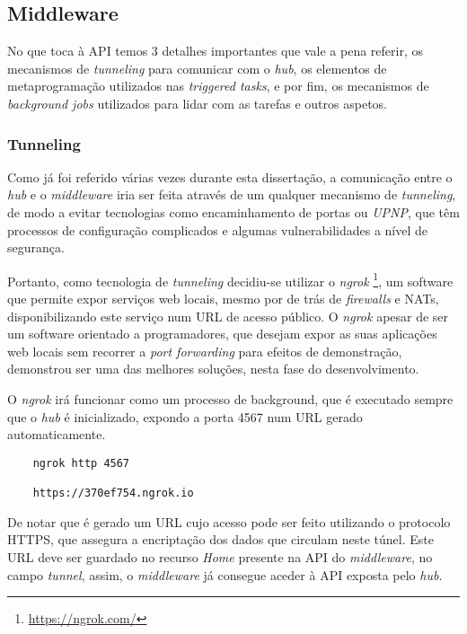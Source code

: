 \subsection{Middleware}

No que toca à API temos 3 detalhes importantes que vale a pena referir, os mecanismos de \textit{tunneling} para comunicar com o \textit{hub}, os elementos de metaprogramação utilizados nas \textit{triggered tasks}, e por fim, os mecanismos de \textit{background jobs} utilizados para lidar com as tarefas e outros aspetos.

\subsubsection{Tunneling}

Como já foi referido várias vezes durante esta dissertação, a comunicação entre o \textit{hub} e o \textit{middleware} iria ser feita através de um qualquer mecanismo de \textit{tunneling}, de modo a evitar tecnologias como encaminhamento de portas ou \textit{UPNP}, que têm processos de configuração complicados e algumas vulnerabilidades a nível de segurança.

Portanto, como tecnologia de \textit{tunneling} decidiu-se utilizar o \textit{ngrok} \footnote{\url{https://ngrok.com/}}, um software que permite expor serviços web locais, mesmo por de trás de \textit{firewalls} e NATs, disponibilizando este serviço num URL de acesso público. O \textit{ngrok} apesar de ser um software orientado a programadores, que desejam expor as suas aplicações web locais sem recorrer a \textit{port forwarding} para efeitos de demonstração, demonstrou ser uma das melhores soluções, nesta fase do desenvolvimento.

O \textit{ngrok} irá funcionar como um processo de background, que é executado sempre que o \textit{hub} é inicializado, expondo a porta 4567 num URL gerado automaticamente.

\begin{verbatim}
    ngrok http 4567

    https://370ef754.ngrok.io
\end{verbatim}

De notar que é gerado um URL cujo acesso pode ser feito utilizando o protocolo HTTPS, que assegura a encriptação dos dados que circulam neste túnel. Este URL deve ser guardado no recurso \textit{Home} presente na API do \textit{middleware}, no campo \textit{tunnel}, assim, o \textit{middleware} já consegue aceder à API exposta pelo \textit{hub}.

